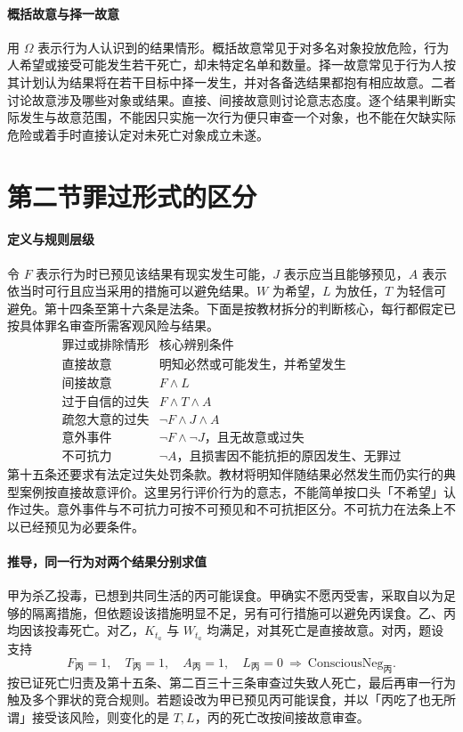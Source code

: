 \paragraph{概括故意与择一故意}
用 $\Omega$ 表示行为人认识到的结果情形。概括故意常见于对多名对象投放危险，行为人希望或接受可能发生若干死亡，却未特定名单和数量。择一故意常见于行为人按其计划认为结果将在若干目标中择一发生，并对各备选结果都抱有相应故意。二者讨论故意涉及哪些对象或结果。直接、间接故意则讨论意志态度。逐个结果判断实际发生与故意范围，不能因只实施一次行为便只审查一个对象，也不能在欠缺实际危险或着手时直接认定对未死亡对象成立未遂。

\section{第二节\quad 罪过形式的区分}

\paragraph{定义与规则层级}
令 $F$ 表示行为时已预见该结果有现实发生可能，$J$ 表示应当且能够预见，$A$ 表示依当时可行且应当采用的措施可以避免结果。$W$ 为希望，$L$ 为放任，$T$ 为轻信可避免。第十四条至第十六条是法条。下面是按教材拆分的判断核心，每行都假定已按具体罪名审查所需客观风险与结果。
\[
\begin{array}{c|l}
\text{罪过或排除情形} & \text{核心辨别条件}\\ \hline
\text{直接故意} & \text{明知必然或可能发生，并希望发生}\\
\text{间接故意} & F\land L\\
\text{过于自信的过失} & F\land T\land A\\
\text{疏忽大意的过失} & \neg F\land J\land A\\
\text{意外事件} & \neg F\land\neg J\text{，且无故意或过失}\\
\text{不可抗力} & \neg A\text{，且损害因不能抗拒的原因发生、无罪过}
\end{array}
\]
第十五条还要求有法定过失处罚条款。教材将明知伴随结果必然发生而仍实行的典型案例按直接故意评价。这里另行评价行为的意志，不能简单按口头「不希望」认作过失。意外事件与不可抗力可按不可预见和不可抗拒区分。不可抗力在法条上不以已经预见为必要条件。

\paragraph{推导，同一行为对两个结果分别求值}
甲为杀乙投毒，已想到共同生活的丙可能误食。甲确实不愿丙受害，采取自以为足够的隔离措施，但依题设该措施明显不足，另有可行措施可以避免丙误食。乙、丙均因该投毒死亡。对乙，$K_{t_a}$ 与 $W_{t_a}$ 均满足，对其死亡是直接故意。对丙，题设支持
\[
F_{\text{丙}}=1,\quad T_{\text{丙}}=1,\quad
A_{\text{丙}}=1,\quad L_{\text{丙}}=0
   \ \Longrightarrow\ \mathrm{ConsciousNeg}_{\text{丙}}.
\]
按已证死亡归责及第十五条、第二百三十三条审查过失致人死亡，最后再审一行为触及多个罪状的竞合规则。若题设改为甲已预见丙可能误食，并以「丙吃了也无所谓」接受该风险，则变化的是 $T,L$，丙的死亡改按间接故意审查。

